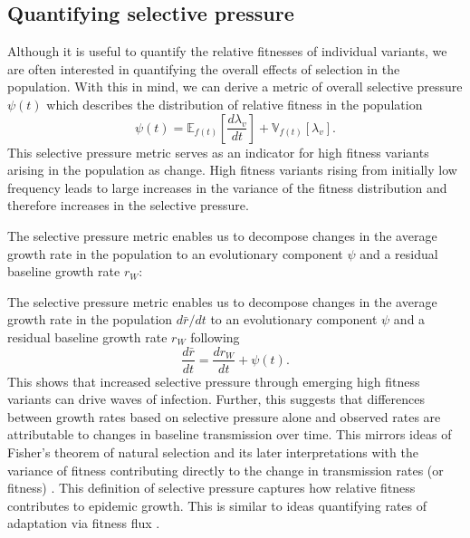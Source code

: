 \documentclass[11pt,oneside,letterpaper]{article}
\newcommand{\Expect}{\mathbb{E}}
\newcommand{\Var}{\mathbb{V}}
\newcommand{\wt}{W}
\begin{document}
\subsection*{Quantifying selective pressure}

Although it is useful to quantify the relative fitnesses of individual variants, we are often interested in quantifying the overall effects of selection in the population.
With this in mind, we can derive a metric of overall selective pressure $\psi(t)$ which describes the distribution of relative fitness in the population
\begin{equation}
\psi(t) =  \Expect_{f(t)}\left[ \frac{d \lambda_v}{d t}\right] +  \Var_{f(t)}[\lambda_{v}].
\end{equation}
This selective pressure metric serves as an indicator for high fitness variants arising in the population as change.
High fitness variants rising from initially low frequency leads to large increases in the variance of the fitness distribution and therefore increases in the selective pressure.

The selective pressure metric enables us to decompose changes in the average growth rate in the population to an evolutionary component $\psi$ and a residual baseline growth rate $r_\wt$:

The selective pressure metric enables us to decompose changes in the average growth rate in the population $d\bar{r}/dt$ to an evolutionary component $\psi$ and a residual baseline growth rate $r_\wt$ following
\begin{equation}
    \frac{d\bar{r}}{dt} = \frac{dr_{\wt}}{dt} + \psi(t).
\end{equation}
This shows that increased selective pressure through emerging high fitness variants can drive waves of infection.
Further, this suggests that differences between growth rates based on selective pressure alone and observed rates are attributable to changes in baseline transmission over time.
This mirrors ideas of Fisher's theorem of natural selection and its later interpretations with the variance of fitness contributing directly to the change in transmission rates (or fitness) \cite{Ewens1989, Ewens2024}.
This definition of selective pressure captures how relative fitness contributes to epidemic growth.
This is similar to ideas quantifying rates of adaptation via fitness flux \cite{Mustonen2010}.
\end{document}
